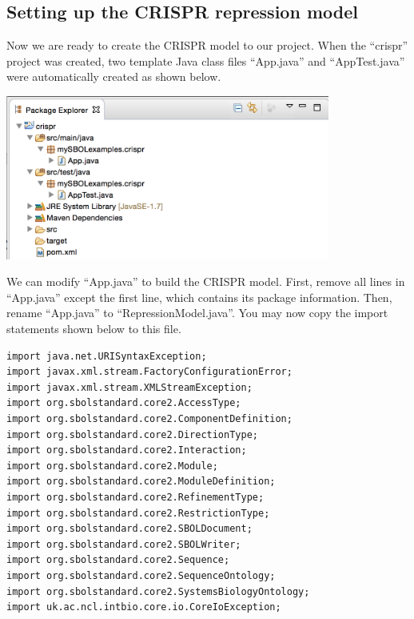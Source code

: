 \subsection*{Setting up the CRISPR repression model}
Now we are ready to create the CRISPR model to our project. When the ``crispr'' project was created, two template Java class files ``App.java'' and ``AppTest.java'' were automatically created as shown below. 
\begin{center}
  \includegraphics[width=0.8\textwidth]{figures/addCrisprModel1}
\end{center}

We can modify ``App.java'' to build the CRISPR model. First, remove all lines in ``App.java'' except the first line, which contains its package information. Then, rename ``App.java'' to ``RepressionModel.java''. You may now copy the import statements shown below to this file.

\begin{minipage}{0.95\textwidth} 
\begin{lstlisting}
import java.net.URISyntaxException;
import javax.xml.stream.FactoryConfigurationError;
import javax.xml.stream.XMLStreamException;
import org.sbolstandard.core2.AccessType;
import org.sbolstandard.core2.ComponentDefinition;
import org.sbolstandard.core2.DirectionType;
import org.sbolstandard.core2.Interaction;
import org.sbolstandard.core2.Module;
import org.sbolstandard.core2.ModuleDefinition;
import org.sbolstandard.core2.RefinementType;
import org.sbolstandard.core2.RestrictionType;
import org.sbolstandard.core2.SBOLDocument;
import org.sbolstandard.core2.SBOLWriter;
import org.sbolstandard.core2.Sequence;
import org.sbolstandard.core2.SequenceOntology;
import org.sbolstandard.core2.SystemsBiologyOntology;
import uk.ac.ncl.intbio.core.io.CoreIoException;
\end{lstlisting}
\end{minipage}

